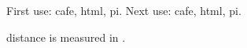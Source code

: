 \documentclass[12pt]{article}
\begin{document}
First use: \gls{cafe}, \gls{html}, \gls{pi}. Next use: \gls{cafe}, \gls{html}, \gls{pi}. 

\Gls{distance} is measured in .
\printunsrtglossaries %
 
\end{document}
